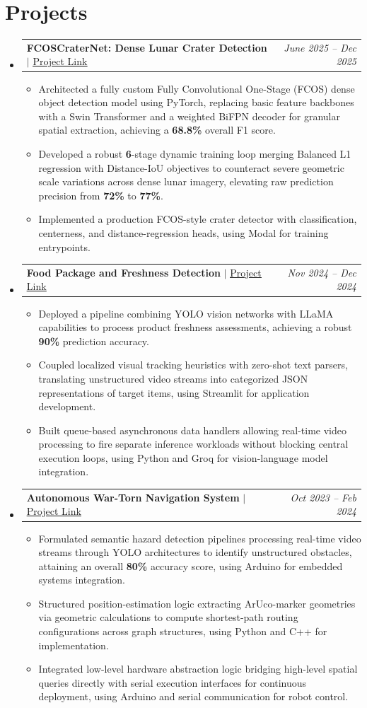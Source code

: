 \documentclass[letterpaper,10pt]{article}
\makeatletter
\newcommand{\resumeItem}[1]{
  \item{\small\setlength{\baselineskip}{10pt} #1 \vspace{-2pt}}
}
\newcommand{\resumeProjectHeading}[2]{
    \item
    \begin{tabular*}{\textwidth}{@{}l@{\extracolsep{\fill}}r@{}}
      \small#1 & \small\textit{#2} \\
    \end{tabular*}\vspace{-4pt}
}
\newcommand{\resumeSubHeadingListStart}{\begin{itemize}[leftmargin=0in, label={}, topsep=0pt, partopsep=0pt]}
\newcommand{\resumeSubHeadingListEnd}{\end{itemize}}
\newcommand{\resumeItemListStart}{\begin{itemize}[leftmargin=0.15in, label={$\bullet$}, topsep=0pt, partopsep=0pt, itemsep=3pt, parsep=0pt]}
\newcommand{\resumeItemListEnd}{\end{itemize}}
\makeatother
\begin{document}
\section{Projects}
\resumeSubHeadingListStart
  \resumeProjectHeading
    {\textbf{FCOSCraterNet: Dense Lunar Crater Detection} $|$ \href{https://github.com/abandonedmonk/Lunar-Crater-Detection-using-Swin-Transformer}{\underline{Project Link}}}{June 2025 -- Dec 2025}
    \resumeItemListStart
      \resumeItem{Architected a fully custom Fully Convolutional One-Stage (FCOS) dense object detection model using PyTorch, replacing basic feature backbones with a Swin Transformer and a weighted BiFPN decoder for granular spatial extraction, achieving a \textbf{68.8\%} overall F1 score.}
      \resumeItem{Developed a robust \textbf{6}-stage dynamic training loop merging Balanced L1 regression with Distance-IoU objectives to counteract severe geometric scale variations across dense lunar imagery, elevating raw prediction precision from \textbf{72\%} to \textbf{77\%}.}
      \resumeItem{Implemented a production FCOS-style crater detector with classification, centerness, and distance-regression heads, using Modal for training entrypoints.}
    \resumeItemListEnd
  \resumeProjectHeading
    {\textbf{Food Package and Freshness Detection} $|$ \href{https://github.com/abandonedmonk/Food-Package-and-Freshness-Detection}{\underline{Project Link}}}{Nov 2024 -- Dec 2024}
    \resumeItemListStart
      \resumeItem{Deployed a pipeline combining YOLO vision networks with LLaMA capabilities to process product freshness assessments, achieving a robust \textbf{90\%} prediction accuracy.}
      \resumeItem{Coupled localized visual tracking heuristics with zero-shot text parsers, translating unstructured video streams into categorized JSON representations of target items, using Streamlit for application development.}
      \resumeItem{Built queue-based asynchronous data handlers allowing real-time video processing to fire separate inference workloads without blocking central execution loops, using Python and Groq for vision-language model integration.}
    \resumeItemListEnd
  \resumeProjectHeading
    {\textbf{Autonomous War-Torn Navigation System} $|$ \href{https://github.com/abandonedmonk/Autonomous-War-Torn-Navigation-System}{\underline{Project Link}}}{Oct 2023 -- Feb 2024}
    \resumeItemListStart
      \resumeItem{Formulated semantic hazard detection pipelines processing real-time video streams through YOLO architectures to identify unstructured obstacles, attaining an overall \textbf{80\%} accuracy score, using Arduino for embedded systems integration.}
      \resumeItem{Structured position-estimation logic extracting ArUco-marker geometries via geometric calculations to compute shortest-path routing configurations across graph structures, using Python and C++ for implementation.}
      \resumeItem{Integrated low-level hardware abstraction logic bridging high-level spatial queries directly with serial execution interfaces for continuous deployment, using Arduino and serial communication for robot control.}
    \resumeItemListEnd
\resumeSubHeadingListEnd
\end{document}
